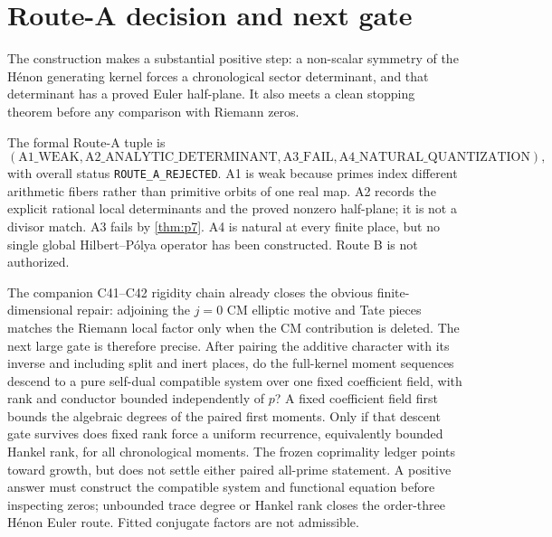 \section{Route-A decision and next gate}

The construction makes a substantial positive step: a non-scalar symmetry
of the H\'enon generating kernel forces a chronological sector determinant,
and that determinant has a proved Euler half-plane.  It also meets a clean
stopping theorem before any comparison with Riemann zeros.

The formal Route-A tuple is
\[
(\mathrm{A1\_WEAK},\mathrm{A2\_ANALYTIC\_DETERMINANT},
\mathrm{A3\_FAIL},\mathrm{A4\_NATURAL\_QUANTIZATION}),
\]
with overall status \texttt{ROUTE\_A\_REJECTED}.  A1 is weak because primes
index different arithmetic fibers rather than primitive orbits of one real
map.  A2 records the explicit rational local determinants and the proved
nonzero half-plane; it is not a divisor match.  A3 fails by
\cref{thm:p7}.  A4 is natural at every finite place, but no single global
Hilbert--P\'olya operator has been constructed.  Route B is not authorized.

The companion C41--C42 rigidity chain already closes the obvious
finite-dimensional repair: adjoining the $j=0$ CM elliptic motive and Tate
pieces matches the Riemann local factor only when the CM contribution is
deleted.  The next large gate is therefore precise.  After pairing the
additive character with its inverse and including split and inert places, do
the full-kernel moment sequences descend to a pure self-dual compatible
system over one fixed coefficient field, with rank and conductor bounded
independently of $p$?  A fixed coefficient field first bounds the algebraic
degrees of the paired first moments.  Only if that descent gate survives does
fixed rank force a uniform recurrence, equivalently bounded Hankel rank, for
all chronological moments.  The frozen coprimality ledger points toward
growth, but does not settle either paired all-prime statement.  A positive
answer must construct the compatible system and functional equation before
inspecting zeros; unbounded trace degree or Hankel rank closes the
order-three H\'enon Euler route.  Fitted conjugate factors are not admissible.
